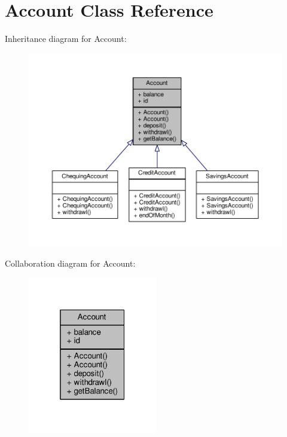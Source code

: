 \hypertarget{classAccount}{\section{Account Class Reference}
\label{classAccount}
}


Inheritance diagram for Account\-:
\nopagebreak
\begin{figure}[H]
\begin{center}
\leavevmode
\includegraphics[width=350pt]{classAccount__inherit__graph}
\end{center}
\end{figure}


Collaboration diagram for Account\-:
\nopagebreak
\begin{figure}[H]
\begin{center}
\leavevmode
\includegraphics[width=160pt]{classAccount__coll__graph}
\end{center}
\end{figure}
